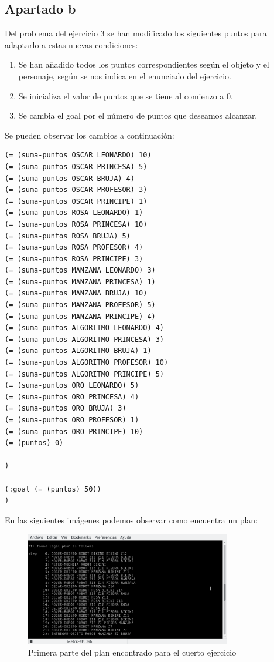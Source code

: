 \subsection{Apartado b}
Del problema del ejercicio 3 se han modificado los siguientes puntos para adaptarlo a estas nuevas condiciones:
\begin{enumerate}
	\item Se han añadido todos los puntos correspondientes según el objeto y el personaje, según se nos indica en el enunciado del ejercicio.
	\item Se inicializa el valor de puntos que se tiene al comienzo a 0.
	\item Se cambia el goal por el número de puntos que deseamos alcanzar.
\end{enumerate}
Se pueden observar los cambios a continuación:
\begin{verbatim}
(= (suma-puntos OSCAR LEONARDO) 10)
(= (suma-puntos OSCAR PRINCESA) 5)
(= (suma-puntos OSCAR BRUJA) 4)
(= (suma-puntos OSCAR PROFESOR) 3)
(= (suma-puntos OSCAR PRINCIPE) 1)
(= (suma-puntos ROSA LEONARDO) 1)
(= (suma-puntos ROSA PRINCESA) 10)
(= (suma-puntos ROSA BRUJA) 5)
(= (suma-puntos ROSA PROFESOR) 4)
(= (suma-puntos ROSA PRINCIPE) 3)
(= (suma-puntos MANZANA LEONARDO) 3)
(= (suma-puntos MANZANA PRINCESA) 1)
(= (suma-puntos MANZANA BRUJA) 10)
(= (suma-puntos MANZANA PROFESOR) 5)
(= (suma-puntos MANZANA PRINCIPE) 4)
(= (suma-puntos ALGORITMO LEONARDO) 4)
(= (suma-puntos ALGORITMO PRINCESA) 3)
(= (suma-puntos ALGORITMO BRUJA) 1)
(= (suma-puntos ALGORITMO PROFESOR) 10)
(= (suma-puntos ALGORITMO PRINCIPE) 5)
(= (suma-puntos ORO LEONARDO) 5)
(= (suma-puntos ORO PRINCESA) 4)
(= (suma-puntos ORO BRUJA) 3)
(= (suma-puntos ORO PROFESOR) 1)
(= (suma-puntos ORO PRINCIPE) 10)
(= (puntos) 0)

)

(:goal (= (puntos) 50))
)
\end{verbatim}
En las siguientes imágenes podemos observar como encuentra un plan:
\begin{figure}[H]
	\centering
	\includegraphics[width=0.8\textwidth]{img8}
	\caption{Primera parte del plan encontrado para el cuerto ejercicio}
\end{figure}
